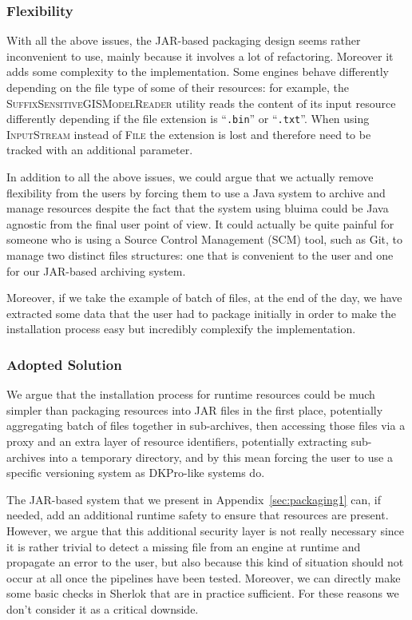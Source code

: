\documentclass{article}
\newcommand{\ID}[1]{{\textsc{#1}}}
\newcommand{\PATH}[1]{\mbox{\texttt{#1}}}
\newcommand{\JAR}{JAR\xspace}
\begin{document}
\subsubsection{Flexibility}

With all the above issues, the \JAR-based packaging design seems rather inconvenient to use, mainly
because it involves a lot of refactoring. Moreover it adds some complexity to the implementation.
Some engines behave differently depending on the file type of some of their resources: for example,
the \ID{SuffixSensitiveGISModelReader} utility reads the content of its input resource differently
depending if the file extension is ``\PATH{.bin}'' or ``\PATH{.txt}''. When using \ID{InputStream}
instead of \ID{File} the extension is lost and therefore need to be tracked with an additional
parameter.

In addition to all the above issues, we could argue that we actually remove flexibility from the
users by forcing them to use a Java system to archive and manage resources despite the fact that the
system using bluima could be Java agnostic from the final user point of view. It could actually be
quite painful for someone who is using a Source Control Management (SCM) tool, such as Git, to
manage two distinct files structures: one that is convenient to the user and one for our \JAR-based
archiving system.

Moreover, if we take the example of batch of files, at the end of the day, we have extracted some
data that the user had to package initially in order to make the installation process easy but
incredibly complexify the implementation.


\subsubsection{Adopted Solution}

We argue that the installation process for runtime resources could be much simpler than packaging
resources into \JAR files in the first place, potentially aggregating batch of files together in
sub-archives, then accessing those files via a proxy and an extra layer of resource identifiers,
potentially extracting sub-archives into a temporary directory, and by this mean forcing the user to
use a specific versioning system as DKPro-like systems do.

The \JAR-based system that we present in Appendix~\ref{sec:packaging1} can, if needed, add an
additional runtime safety to ensure that resources are present. However, we argue that this
additional security layer is not really necessary since it is rather trivial to detect a missing
file from an engine at runtime and propagate an error to the user, but also because this kind of
situation should not occur at all once the pipelines have been tested. Moreover, we can directly
make some basic checks in Sherlok that are in practice sufficient. For these reasons we don't
consider it as a critical downside.
\end{document}
